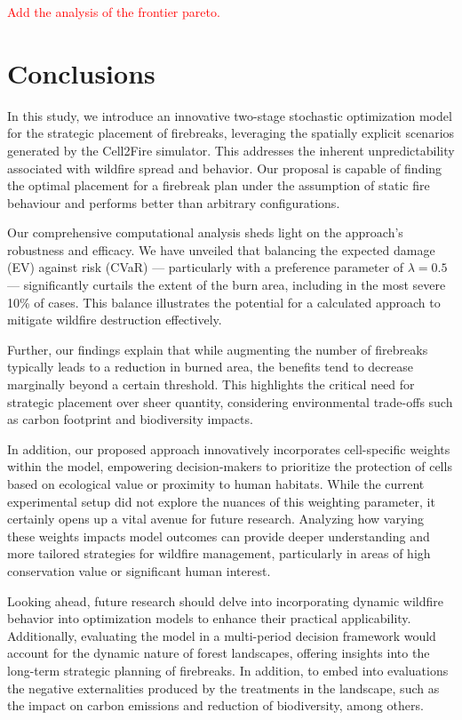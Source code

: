 \documentclass[a4paper,fleqn]{cas-sc}
\begin{document}
\textcolor{red}{Add the analysis of the frontier pareto.}

\section{Conclusions}\label{Sec:conclusions}
In this study, we introduce an innovative two-stage stochastic optimization model for the strategic placement of firebreaks, leveraging the spatially explicit scenarios generated by the Cell2Fire simulator. This addresses the inherent unpredictability associated with wildfire spread and behavior. Our proposal is capable of finding the optimal placement for a firebreak plan under the assumption of static fire behaviour and performs better than arbitrary configurations.

Our comprehensive computational analysis sheds light on the approach's robustness and efficacy. We have unveiled that balancing the expected damage (EV) against risk (CVaR) — particularly with a preference parameter of $\lambda=0.5$— significantly curtails the extent of the burn area, including in the most severe 10\% of cases. This balance illustrates the potential for a calculated approach to mitigate wildfire destruction effectively.

Further, our findings explain that while augmenting the number of firebreaks typically leads to a reduction in burned area, the benefits tend to decrease marginally beyond a certain threshold. This highlights the critical need for strategic placement over sheer quantity, considering environmental trade-offs such as carbon footprint and biodiversity impacts.

In addition, our proposed approach innovatively incorporates cell-specific weights within the model, empowering decision-makers to prioritize the protection of cells based on ecological value or proximity to human habitats. While the current experimental setup did not explore the nuances of this weighting parameter, it certainly opens up a vital avenue for future research. Analyzing how varying these weights impacts model outcomes can provide deeper understanding and more tailored strategies for wildfire management, particularly in areas of high conservation value or significant human interest.

Looking ahead, future research should delve into incorporating dynamic wildfire behavior into optimization models to enhance their practical applicability. Additionally, evaluating the model in a multi-period decision framework would account for the dynamic nature of forest landscapes, offering insights into the long-term strategic planning of firebreaks. In addition, to embed into evaluations the negative externalities produced by the treatments in the landscape, such as the impact on carbon emissions and reduction of biodiversity, among others.
\end{document}
